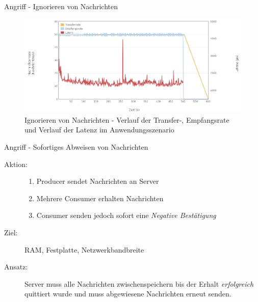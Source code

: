 \documentclass[10pt]{beamer}
\begin{document}
\begin{frame}{Angriff - Ignorieren von Nachrichten}	
\begin{figure}[!htb]
	\centering
	\includegraphics[width=\textwidth]{img/no/no_scenario.png}
	\caption{\centering Ignorieren von Nachrichten - Verlauf der Transfer-, Empfangsrate und Verlauf der Latenz im Anwendungsszenario}
	\label{fig:no-scenario}
\end{figure}
\end{frame}


\begin{frame}[t]{Angriff - Sofortiges Abweisen von Nachrichten}
\begin{description}
	\item[Aktion:]
		\begin{enumerate}
			\item Producer sendet Nachrichten an Server
			\item Mehrere Consumer erhalten Nachrichten
			\item Consumer senden jedoch sofort eine \textsl{Negative Bestätigung}
		\end{enumerate} \smallskip
	\item[Ziel:] RAM, Festplatte, Netzwerkbandbreite \smallskip
	\item[Ansatz:] Server muss alle Nachrichten zwischenspeichern bis der Erhalt \textsl{erfolgreich} quittiert wurde und muss abgewiesene Nachrichten erneut senden.
\end{description}
\end{frame}
\end{document}
